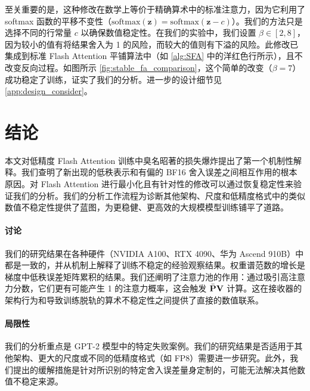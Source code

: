 \documentclass{article} %
\begin{document}
至关重要的是，这种修改在数学上等价于精确算术中的标准注意力，因为它利用了 softmax 函数的平移不变性（$\mathrm{softmax}(\mathbf{z}) = \mathrm{softmax}(\mathbf{z} - c)$）。我们的方法只是选择不同的行常量 $c$ 以确保数值稳定性。在我们的实验中，我们设置 $\beta \in [2, 8]$，因为较小的值有将结果舍入为 1 的风险，而较大的值则有下溢的风险。此修改已集成到标准 Flash Attention 平铺算法中（如 \cref{alg:SFA} 中的{\color{magenta}洋红色}行所示），且不改变反向过程。如图所示 \cref{fig:stable_fa_comparison}，这个简单的改变（$\beta=7$）成功稳定了训练，证实了我们的分析。进一步的设计细节见 \cref{app:design_consider}。



\section{结论}

本文对低精度 Flash Attention 训练中臭名昭著的损失爆炸提出了第一个机制性解释。我们查明了新出现的低秩表示和有偏的 BF16 舍入误差之间相互作用的根本原因。对 Flash Attention 进行最小化且有针对性的修改可以通过恢复稳定性来验证我们的分析。我们的分析工作流程为诊断其他架构、尺度和低精度格式中的类似数值不稳定性提供了蓝图，为更稳健、更高效的大规模模型训练铺平了道路。

\paragraph{讨论}
我们的研究结果在各种硬件（NVIDIA A100、RTX 4090、华为 Ascend 910B）中都是一致的，并从机制上解释了训练不稳定的经验观察结果。权重谱范数的增长是梯度中低秩误差矩阵累积的结果。我们还阐明了注意力池的作用：通过吸引高注意力分数，它们更有可能产生 1 的注意力概率，这会触发 $\bar{{\mathbf{P}}}{\mathbf{V}}$ 计算。这在接收器的架构行为和导致训练脱轨的算术不稳定性之间提供了直接的数值联系。

\paragraph{局限性}
我们的分析重点是 GPT-2 模型中的特定失败案例。我们的研究结果是否适用于其他架构、更大的尺度或不同的低精度格式（如 FP8）需要进一步研究。此外，我们提出的缓解措施是针对所识别的特定舍入误差量身定制的，可能无法解决其他数值不稳定来源。


\end{document}
